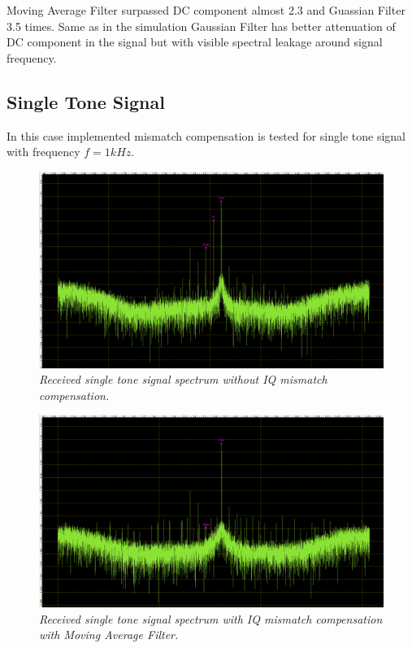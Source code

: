 \documentclass[en,printmode]{mgr}
\begin{document}
		Moving Average Filter surpassed DC component almost 2.3 and Guassian Filter 
		3.5 times. Same as in the simulation Gaussian Filter has better attenuation of DC component in the
		signal but with visible spectral leakage around signal frequency.
   		\newpage
		\subsection*{Single Tone Signal}
		In this case implemented mismatch compensation is tested for
		single tone signal with frequency $f=1kHz$.
		
		\begin{figure}[H]
    		\centering
   			\includegraphics[width=\textwidth]{plots/single_input.png}
   		 	\caption{\textit{Received single tone signal spectrum without IQ mismatch compensation.}}
   		 \end{figure}
   		 	
		\begin{figure}[!htb]
    		\centering
   			\includegraphics[width=\textwidth]{plots/my_single_mav.png}
   		 	\caption{\textit{Received single tone signal spectrum with IQ mismatch compensation with
   		 	Moving Average Filter.}}
   		\end{figure}
   		
\end{document}
